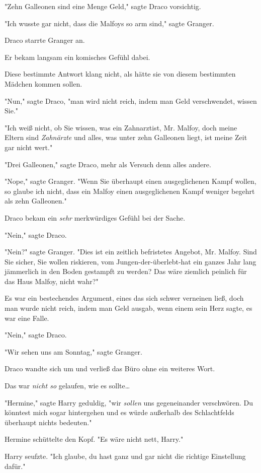 {"Zehn Galleonen sind eine Menge Geld," sagte Draco vorsichtig.

"Ich wusste gar nicht, dass die Malfoys so arm sind," sagte Granger.

Draco starrte Granger an.

Er bekam langsam ein komisches Gefühl dabei.

Diese bestimmte Antwort klang nicht, als hätte sie von diesem bestimmten Mädchen kommen sollen.

"Nun," sagte Draco, "man wird nicht reich, indem man Geld verschwendet, wissen Sie."

"Ich weiß nicht, ob Sie wissen, was ein Zahnarztist, Mr. Malfoy, doch meine Eltern sind \emph{Zahnärzte} und alles, was unter zehn Galleonen liegt, ist meine Zeit gar nicht wert."

"Drei Galleonen," sagte Draco, mehr als Versuch denn alles andere.

"Nope," sagte Granger. "Wenn Sie überhaupt einen ausgeglichenen Kampf wollen, so glaube ich nicht, dass ein Malfoy einen ausgeglichenen Kampf weniger begehrt als zehn Galleonen."

Draco bekam ein \emph{sehr} merkwürdiges Gefühl bei der Sache.

"Nein," sagte Draco.

"Nein?" sagte Granger. "Dies ist ein zeitlich befristetes Angebot, Mr. Malfoy. Sind Sie sicher, Sie wollen riskieren, vom Jungen-der-überlebt-hat ein ganzes Jahr lang jämmerlich in den Boden gestampft zu werden? Das wäre ziemlich peinlich für das Haus Malfoy, nicht wahr?"

Es war ein bestechendes Argument, eines das sich schwer verneinen ließ, doch man wurde nicht reich, indem man Geld ausgab, wenn einem sein Herz sagte, es war eine Falle.

"Nein," sagte Draco.

"Wir sehen uns am Sonntag," sagte Granger.

Draco wandte sich um und verließ das Büro ohne ein weiteres Wort.

Das war \emph{nicht so} gelaufen, wie es sollte…

\later

"Hermine," sagte Harry geduldig, "wir \emph{sollen} uns gegeneinander verschwören. Du könntest mich sogar hintergehen und es würde außerhalb des Schlachtfelds überhaupt nichts bedeuten."

Hermine schüttelte den Kopf. "Es wäre nicht nett, Harry."

Harry seufzte. "Ich glaube, du hast ganz und gar nicht die richtige Einstellung dafür."

}
